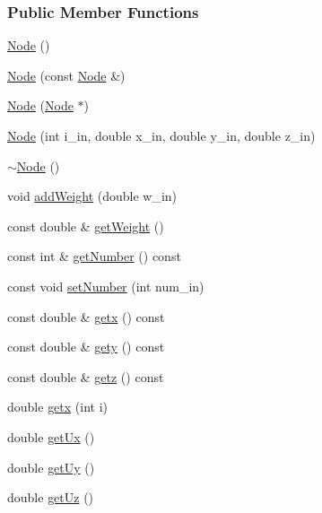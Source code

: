 \subsubsection*{Public Member Functions}
\begin{DoxyCompactItemize}
\item 
\hyperlink{classmknix_1_1_node_ad5856bda16e785c0900ee1d6c18ccecb}{Node} ()
\item 
\hyperlink{classmknix_1_1_node_a2e851819b5478c2110bbbd71fec6a3bb}{Node} (const \hyperlink{classmknix_1_1_node}{Node} \&)
\item 
\hyperlink{classmknix_1_1_node_a25d1e3213d5db7c7d29d68c00036f4cf}{Node} (\hyperlink{classmknix_1_1_node}{Node} $\ast$)
\item 
\hyperlink{classmknix_1_1_node_a14799609698201dafea7d60684c12708}{Node} (int i\-\_\-in, double x\-\_\-in, double y\-\_\-in, double z\-\_\-in)
\item 
\hyperlink{classmknix_1_1_node_adb415bbf3cd9031c1b45f3b2d36282e2}{$\sim$\-Node} ()
\item 
void \hyperlink{classmknix_1_1_node_a53140afb6f6f4dcffb1003e7fc86172d}{add\-Weight} (double w\-\_\-in)
\item 
const double \& \hyperlink{classmknix_1_1_node_ae8b387a63a6c6e1daaa4b33360dd6cd3}{get\-Weight} ()
\item 
const int \& \hyperlink{classmknix_1_1_node_a05e294322b5a045037da041beaaff9f8}{get\-Number} () const 
\item 
const void \hyperlink{classmknix_1_1_node_a6c08fe7fdeb154268c4a0a6e435bc561}{set\-Number} (int num\-\_\-in)
\item 
const double \& \hyperlink{classmknix_1_1_node_ab966e048b1c4bbdea0cae42ac590a55d}{getx} () const 
\item 
const double \& \hyperlink{classmknix_1_1_node_a0ebccafbcfab353bdaac6dff3394b5dc}{gety} () const 
\item 
const double \& \hyperlink{classmknix_1_1_node_adefe28450195b0afea01565fad955bdc}{getz} () const 
\item 
double \hyperlink{classmknix_1_1_node_ae476990e21c07b32a42360f71f356dc4}{getx} (int i)
\item 
double \hyperlink{classmknix_1_1_node_a0402cc10656f4f1bf23a3a2e5530d847}{get\-Ux} ()
\item 
double \hyperlink{classmknix_1_1_node_a74e1bb5cd1a76a67af2bfac8c4f7531c}{get\-Uy} ()
\item 
double \hyperlink{classmknix_1_1_node_a66634d10c0cb501e7350de66adf3c09b}{get\-Uz} ()

\end{DoxyCompactItemize}
